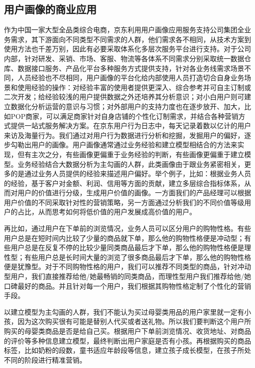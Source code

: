 		\subsection{用户画像的商业应用}
		作为中国一家大型全品类综合电商，京东利用用户画像应用服务支持公司集团全业务需求\citep{user_profile_jingdong}，其下游面向不同类型不同需求的人群，他们需求各不相同，从技术方案到使用方法也千差万别，因此有必要采取体系化多层次服务平台进行支持。对于公司内部，针对研发、采销、市场、客服、物流等各体系不同需求分别采取统一数据仓库、数据接口服务、产品化平台多种服务方式提供支持，针对各业务线需求场景不同，人员经验也不尽相同，用户画像的平台化给内部使用人员打造切合自身业务场景和使用经验的操作：对经验丰富的使用者提供更深入、综合参考并可自主订制或二次开发；给经验较浅的用户提供数据之外还培养其分析意识；对小白用户则可建立数据化分析运营的意识与习惯；对外部用户的支持力度也在逐步放开、加大，比如POP商家，可以满足商家针对自身店铺的个性化订制需求，并结合各种营销方式提供一站式服务解决方案。在京东用户行为日志中，每天记录着数以亿计的用户来访及海量行为。我们通过对用户行为数据进行分析和挖掘，发掘用户的偏好，逐步勾勒出用户的画像。用户画像通常通过业务经验和建立模型相结合的方法来实现，但有主次之分，有些画像更偏重于业务经验的判断，有些画像更偏重于建立模型。业务经验结合大数据分析为主勾画的人群，此类画像由于跟业务紧密相关，更多的是通过业务人员提供的经验来描述用户偏好。举个例子，比如：根据业务人员的经验，基于客户对金额、利润、信用等方面的贡献，建立多层综合指标体系，从而对用户的价值进行分级，生成用户价值的画像。一方面我们的产品经理可以根据用户价值的不同采取针对性的营销策略，另一方面通过分析我们的不同价值等级用户的占比，从而思考如何将低价值的用户发展成高价值的用户。

		再比如，通过用户在下单前的浏览情况，业务人员可以区分用户的购物性格。有些用户总是在短时间内比较了少量的商品就下单，那么他的购物性格便是冲动型；有些用户总是在反复不停的比较少量同类商品最后才下单，那么他的购物性格便是理性型；有些用户总是长时间大量的浏览了很多商品最后才下单，那么他的购物性格便是犹豫型。对于不同购物性格的用户，我们可以推荐不同类型的商品，针对冲动型用户，我们直接推荐给他/她最畅销的同类商品，而理性型用户我们推荐给他/她口碑最好的商品。并且针对每一个用户，我们根据其购物性格定制了个性化的营销手段。

		以建立模型为主勾画的人群，我们不能认为买过母婴类用品的用户家里就一定有小孩，因为这次购买很有可能是替别人代买或者送礼物。所以我们要判断这个用户所购买的母婴类商品是否是给自己买。根据用户下单前浏览情况、收货地址、对商品的评价等多种信息建立模型，最终判断出用户家庭是否有小孩。再根据购买的商品标签，比如奶粉的段数，童书适应年龄段等信息，建立孩子成长模型，在孩子所处不同的阶段进行精准营销。

